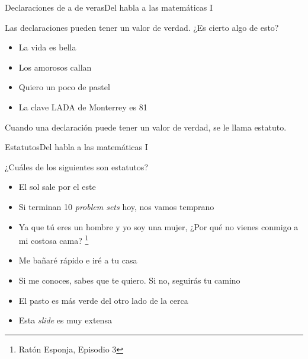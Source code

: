 \documentclass[spanish, c]{beamer}
\newcommand\blfootnote[1]{%
\begingroup
\renewcommand\thefootnote{}\footnote{#1}%
\addtocounter{footnote}{-1}%
\endgroup
}
\begin{document}
\begin{frame}{Declaraciones de a de veras}{Del habla a las matemáticas I}
    
    Las declaraciones pueden tener un valor de verdad. ¿Es cierto algo de esto? \pause

    \bigskip

    \begin{itemize}
        \item La vida es bella
        \item Los amorosos callan
        \item Quiero un poco de pastel
        \item La clave LADA de Monterrey es 81
    \end{itemize} \pause

    \bigskip

    Cuando una declaración puede tener un valor de verdad, se le llama \alert{estatuto}.    

\end{frame}

\begin{frame}{Estatutos}{Del habla a las matemáticas I}

    ¿Cuáles de los siguientes son estatutos? \pause

    \begin{itemize}[<+->]
        \item El sol sale por el este
        \item Si terminan 10 \textit{problem sets} hoy, nos vamos temprano
        \item Ya que tú eres un hombre y yo soy una mujer, ¿Por qué no vienes conmigo a mi costosa cama?\blfootnote{Ratón Esponja, Episodio 3}
        \item Me bañaré rápido e iré a tu casa
        \item Si me conoces, sabes que te quiero. Si no, seguirás tu camino
        \item El pasto es más verde del otro lado de la cerca
        \item Esta \textit{slide} es muy extensa
    \end{itemize}

\end{frame}
\end{document}
